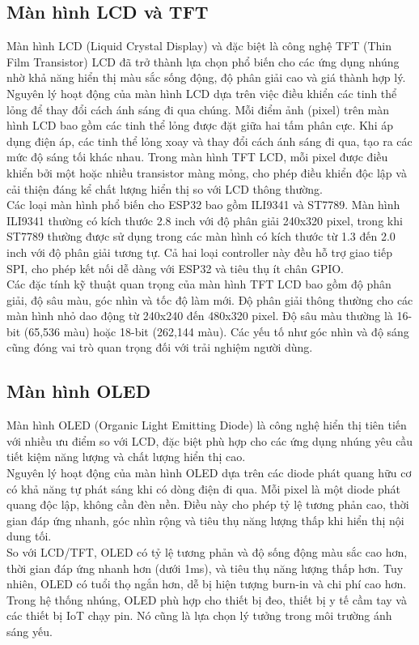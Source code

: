 \subsection{Màn hình LCD và TFT}
\tab Màn hình LCD (Liquid Crystal Display) và đặc biệt là công nghệ TFT (Thin Film Transistor) LCD đã trở thành lựa chọn phổ biến cho các ứng dụng nhúng nhờ khả năng hiển thị màu sắc sống động, độ phân giải cao và giá thành hợp lý.\\
\tab Nguyên lý hoạt động của màn hình LCD dựa trên việc điều khiển các tinh thể lỏng để thay đổi cách ánh sáng đi qua chúng. Mỗi điểm ảnh (pixel) trên màn hình LCD bao gồm các tinh thể lỏng được đặt giữa hai tấm phân cực. Khi áp dụng điện áp, các tinh thể lỏng xoay và thay đổi cách ánh sáng đi qua, tạo ra các mức độ sáng tối khác nhau. Trong màn hình TFT LCD, mỗi pixel được điều khiển bởi một hoặc nhiều transistor màng mỏng, cho phép điều khiển độc lập và cải thiện đáng kể chất lượng hiển thị so với LCD thông thường.\\
\tab Các loại màn hình phổ biến cho ESP32 bao gồm ILI9341 và ST7789. Màn hình ILI9341 thường có kích thước 2.8 inch với độ phân giải 240x320 pixel, trong khi ST7789 thường được sử dụng trong các màn hình có kích thước từ 1.3 đến 2.0 inch với độ phân giải tương tự. Cả hai loại controller này đều hỗ trợ giao tiếp SPI, cho phép kết nối dễ dàng với ESP32 và tiêu thụ ít chân GPIO.\\
\tab Các đặc tính kỹ thuật quan trọng của màn hình TFT LCD bao gồm độ phân giải, độ sâu màu, góc nhìn và tốc độ làm mới. Độ phân giải thông thường cho các màn hình nhỏ dao động từ 240x240 đến 480x320 pixel. Độ sâu màu thường là 16-bit (65,536 màu) hoặc 18-bit (262,144 màu). Các yếu tố như góc nhìn và độ sáng cũng đóng vai trò quan trọng đối với trải nghiệm người dùng.

\subsection{Màn hình OLED}
\tab Màn hình OLED (Organic Light Emitting Diode) là công nghệ hiển thị tiên tiến với nhiều ưu điểm so với LCD, đặc biệt phù hợp cho các ứng dụng nhúng yêu cầu tiết kiệm năng lượng và chất lượng hiển thị cao.\\
\tab Nguyên lý hoạt động của màn hình OLED dựa trên các diode phát quang hữu cơ có khả năng tự phát sáng khi có dòng điện đi qua. Mỗi pixel là một diode phát quang độc lập, không cần đèn nền. Điều này cho phép tỷ lệ tương phản cao, thời gian đáp ứng nhanh, góc nhìn rộng và tiêu thụ năng lượng thấp khi hiển thị nội dung tối.\\
\tab So với LCD/TFT, OLED có tỷ lệ tương phản và độ sống động màu sắc cao hơn, thời gian đáp ứng nhanh hơn (dưới 1ms), và tiêu thụ năng lượng thấp hơn. Tuy nhiên, OLED có tuổi thọ ngắn hơn, dễ bị hiện tượng burn-in và chi phí cao hơn.\\
\tab Trong hệ thống nhúng, OLED phù hợp cho thiết bị đeo, thiết bị y tế cầm tay và các thiết bị IoT chạy pin. Nó cũng là lựa chọn lý tưởng trong môi trường ánh sáng yếu.
